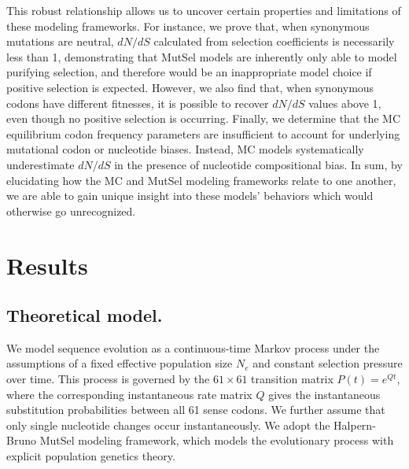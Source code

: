 \documentclass{pnastwo}
\begin{document}
\begin{article}
This robust relationship allows us to uncover certain properties and limitations of these modeling frameworks. For instance, we prove that, when synonymous mutations are neutral, $dN/dS$ calculated from selection coefficients is necessarily less than 1, demonstrating that MutSel models are inherently only able to model purifying selection, and therefore would be an inappropriate model choice if positive selection is expected. However, we also find that, when synonymous codons have different fitnesses, it is possible to recover $dN/dS$ values above 1, even though no positive selection is occurring. Finally, we determine that the MC equilibrium codon frequency parameters are insufficient to account for underlying mutational codon or nucleotide biases. Instead, MC models systematically underestimate $dN/dS$ in the presence of nucleotide compositional bias. In sum, by elucidating how the MC and MutSel modeling frameworks relate to one another, we are able to gain unique insight into these models’ behaviors which would otherwise go unrecognized.
		
		
\section*{Results}
		
		
\subsection*{Theoretical model.}

We model sequence evolution as a continuous-time Markov process \cite{Yang2006} under the assumptions of a fixed effective population size $N_e$ and constant selection pressure over time. This process is governed by the $61 \times 61$ transition matrix $P(t) = e^{Qt}$, where the corresponding instantaneous rate matrix $Q$ gives the instantaneous substitution probabilities between all 61 sense codons. We further assume that only single nucleotide changes occur instantaneously. We adopt the Halpern-Bruno \cite{HalpernBruno1998,YangNielsen2008,Tamurietal2012,Thorne2012} MutSel modeling framework, which models the evolutionary process with explicit population genetics theory. 


\end{article}
\end{document}
